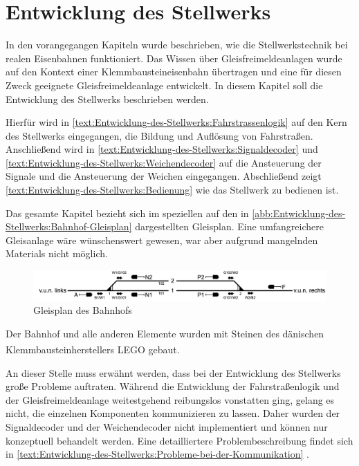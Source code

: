 \chapter{Entwicklung des Stellwerks}\label{text:Entwicklung-des-Stellwerks}

In den vorangegangen Kapiteln wurde beschrieben, wie die Stellwerkstechnik bei realen Eisenbahnen funktioniert. Das Wissen über Gleisfreimeldeanlagen wurde auf den Kontext einer Klemmbausteineisenbahn übertragen und eine für diesen Zweck geeignete Gleisfreimeldeanlage entwickelt. In diesem Kapitel soll die Entwicklung des Stellwerks beschrieben werden.

Hierfür wird in \autoref{text:Entwicklung-des-Stellwerks:Fahrstrassenlogik}  auf den Kern des Stellwerks eingegangen, die Bildung und Auflösung von Fahrstraßen. Anschließend wird in \autoref{text:Entwicklung-des-Stellwerks:Signaldecoder}  und \autoref{text:Entwicklung-des-Stellwerks:Weichendecoder}  auf die Ansteuerung der Signale und die Ansteuerung der Weichen eingegangen. Abschließend zeigt \autoref{text:Entwicklung-des-Stellwerks:Bedienung}  wie das Stellwerk zu bedienen ist.

Das gesamte Kapitel bezieht sich im speziellen auf den in \autoref{abb:Entwicklung-des-Stellwerks:Bahnhof-Gleisplan} dargestellten Gleisplan. Eine umfangreichere Gleisanlage wäre wünschenswert gewesen, war aber aufgrund mangelnden Materials nicht möglich.

\begin{figure}[H]
    \centering
    \includegraphics[width=\textwidth]{Assets/Images/5-Entwicklung-des-Stellwerks/Bahnhof-Gleisplan.png}
    \caption{Gleisplan des Bahnhofs}\label{abb:Entwicklung-des-Stellwerks:Bahnhof-Gleisplan}
\end{figure}

Der Bahnhof und alle anderen Elemente wurden mit Steinen des dänischen Klemmbausteinherstellers LEGO\textsuperscript{\tiny{\textregistered}} gebaut.

An dieser Stelle muss erwähnt werden, dass bei der Entwicklung des Stellwerks große Probleme auftraten. Während die Entwicklung der Fahrstraßenlogik und der Gleisfreimeldeanlage weitestgehend reibungslos vonstatten ging, gelang es nicht, die einzelnen Komponenten kommunizieren zu lassen. Daher wurden der Signaldecoder und der Weichendecoder nicht implementiert und können nur konzeptuell behandelt werden. Eine detailliertere Problembeschreibung findet sich in \autoref{text:Entwicklung-des-Stellwerks:Probleme-bei-der-Kommunikation} .

